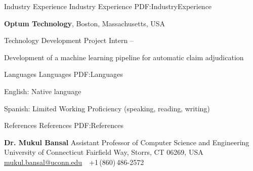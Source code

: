 \documentclass[letterpaper,MMMyyyy,nonstopmode]{simpleresumecv}
\begin{document}
\begin{Body}
\Section
{Industry\newline
Experience}
{Industry Experience}
{PDF:IndustryExperience}

\Entry
{\textbf{Optum Technology}},
Boston, Massachusetts, USA

\Gap
\BulletItem
Technology Development Project Intern
\hfill
{} --
\begin{Detail}
\SubBulletItem
Development of a machine learning pipeline for automatic claim adjudication
\end{Detail}






\Section
{Languages}
{Languages}
{PDF:Languages}

\BulletItem
English: Native language

\Gap
\BulletItem
Spanish: Limited Working Proficiency (speaking, reading, writing)









\Section
{References}
{References}
{PDF:References}

\BulletItem
\textbf{Dr. Mukul Bansal}
\newline
Assistant Professor of Computer Science and Engineering
\newline
University of Connecticut
 Fairfield Way, Storrs, CT 06269, USA
\newline
\href{mailto:mukul.bansal@uconn.edu}
{mukul.bansal@uconn.edu}
\,\SubBulletSymbol\,
+1\,(860)\,486-2572


\end{Body}
\end{document}
